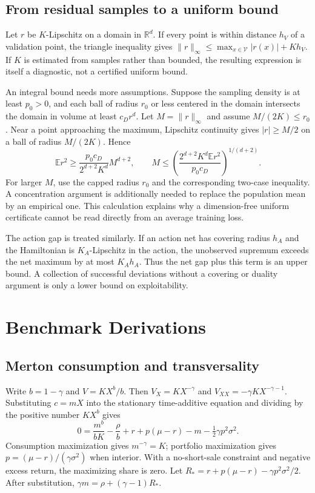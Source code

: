 \documentclass[ecta,nameyear,draft]{econsocart}
\theoremstyle{definition}
\theoremstyle{remark}
\newcommand{\E}{\mathbb E}
\newcommand{\R}{\mathbb R}
\begin{document}
\subsection{From residual samples to a uniform bound}
Let $r$ be $K$-Lipschitz on a domain in $\R^d$. If every point is within distance $h_V$ of a validation point, the triangle inequality gives $\|r\|_\infty\leq\max_{x\in\mathcal V}|r(x)|+Kh_V$. If $K$ is estimated from samples rather than bounded, the resulting expression is itself a diagnostic, not a certified uniform bound.

An integral bound needs more assumptions. Suppose the sampling density is at least $p_0>0$, and each ball of radius $r_0$ or less centered in the domain intersects the domain in volume at least $c_Dr^d$. Let $M=\|r\|_\infty$ and assume $M/(2K)\leq r_0$. Near a point approaching the maximum, Lipschitz continuity gives $|r|\geq M/2$ on a ball of radius $M/(2K)$. Hence
\[
 \E r^2\geq\frac{p_0c_D}{2^{d+2}K^d}M^{d+2},\qquad
 M\leq\left(\frac{2^{d+2}K^d\E r^2}{p_0c_D}\right)^{1/(d+2)}.
\]
For larger $M$, use the capped radius $r_0$ and the corresponding two-case inequality. A concentration argument is additionally needed to replace the population mean by an empirical one. This calculation explains why a dimension-free uniform certificate cannot be read directly from an average training loss.

The action gap is treated similarly. If an action net has covering radius $h_A$ and the Hamiltonian is $K_A$-Lipschitz in the action, the unobserved supremum exceeds the net maximum by at most $K_Ah_A$. Thus the net gap plus this term is an upper bound. A collection of successful deviations without a covering or duality argument is only a lower bound on exploitability.

\section{Benchmark Derivations}
\subsection{Merton consumption and transversality}
Write $b=1-\gamma$ and $V=KX^b/b$. Then $V_X=KX^{-\gamma}$ and $V_{XX}=-\gamma KX^{-\gamma-1}$. Substituting $c=mX$ into the stationary time-additive equation and dividing by the positive number $KX^b$ gives
\[
 0=\frac{m^b}{bK}-\frac\rho b+r+p(\mu-r)-m-\tfrac12\gamma p^2\sigma^2.
\]
Consumption maximization gives $m^{-\gamma}=K$; portfolio maximization gives $p=(\mu-r)/(\gamma\sigma^2)$ when interior. With a no-short-sale constraint and negative excess return, the maximizing share is zero. Let $R_*=r+p(\mu-r)-\gamma p^2\sigma^2/2$. After substitution, $\gamma m=\rho+(\gamma-1)R_*$.
\end{document}
